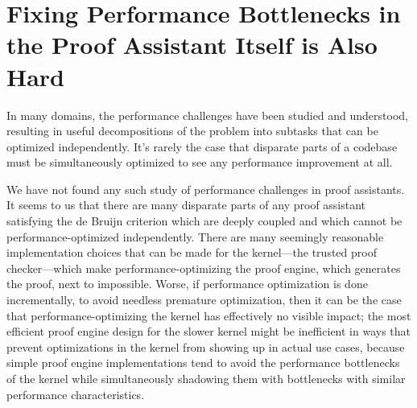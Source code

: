 \section{Fixing Performance Bottlenecks in the Proof Assistant Itself is Also Hard}

In many domains, the performance challenges have been studied and understood, resulting in useful decompositions of the problem into subtasks that can be optimized independently.
It's rarely the case that disparate parts of a codebase must be simultaneously optimized to see any performance improvement at all.

We have not found any such study of performance challenges in proof assistants.
It seems to us that there are many disparate parts of any proof assistant satisfying the de Bruijn criterion which are deeply coupled and which cannot be performance-optimized independently.
There are many seemingly reasonable implementation choices that can be made for the kernel---the trusted proof checker---which make performance-optimizing the proof engine, which generates the proof, next to impossible.
Worse, if performance optimization is done incrementally, to avoid needless premature optimization, then it can be the case that performance-optimizing the kernel has effectively no visible impact; the most efficient proof engine design for the slower kernel might be inefficient in ways that prevent optimizations in the kernel from showing up in actual use cases, because simple proof engine implementations tend to avoid the performance bottlenecks of the kernel while simultaneously shadowing them with bottlenecks with similar performance characteristics.

\begin{comment}
\todo{Find a place for this (h/t conversation with Andres)}:  because we have a kernel and a proof engine on top of it, you need to simultaneously optimize the kernel and the proof engine to see performance improvements; if the kernel API doesn't give you good enough performance on primitives, then there's no hope to optimizing the proof engine, but at the same time if the proof engine is not optimized right, improvements in the performance of the kernel API don't have noticeable impact.

\todo{incorporate Andres' suggestions}
I like the last two sentences.
I would instead lead with something along the lines of ``in many domains, the performance challenges have been studied and understood, resulting in useful decompositions of the problem into subtasks that can be optimized independently.''
``in proof assistants, it doesn't look like anyone has even tried'' :P.
but e g signal processing was a huge mess too before the fast Fourier transform.
coq abstractions are mostly accidents of history.
no other system has a clear performance-conscious story for how these interfaces should be designed either.
\end{comment}




